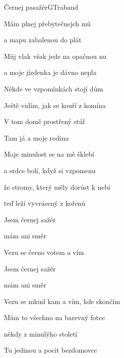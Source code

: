 \begin{song}{Černej pasažér}{G}{Traband}

\begin{SBVerse}

Mám  plnej přebytečnejch mů

a mapu zabalenou do plát

Můj vlak však jede na opačnou nu

a moje jízdenka je dávno nepla


\end{SBVerse}

\begin{SBVerse}

Někde ve vzpomínkách stojí dům

Ještě vidím, jak se kouří z komína

V tom domě prostřený stůl

Tam já a moje rodina

\end{SBVerse}

\begin{SBVerse}

Moje minulost se na mě šklebí

a srdce bolí, když si vzpomenu

že stromy, který měly dorůst k nebi

teď leží vyvrácený z kořenů

\end{SBVerse}

\begin{SBChorus}

Jsem černej sažér

mám  ani směr

Vezu se černo votem a vím

Jsem černej sažér

mám  ani směr

Vezu se nikud kam a vím, kde skončím

\end{SBChorus}

\begin{SBVerse}

Mám to všechno na barevný fotce

někdy z minulýho století

Tu jedinou a pocit bezdomovce


\end{SBVerse}
\end{song}
